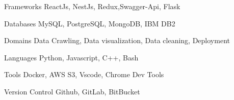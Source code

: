 

\begin{cvskills}

\cvskill
{Frameworks} %
{ReactJs, NestJs, Redux,Swagger-Api, Flask} %

  \cvskill
    {Databases} %
    {MySQL, PostgreSQL, MongoDB, IBM DB2} %


  \cvskill
    {Domains} %
    { Data Crawling, Data visualization, Data cleaning, Deployment} %

  \cvskill
    {Languages} %
    {Python, Javascript, C++, Bash} %

  \cvskill
    {Tools} %
    {Docker, AWS S3, Vscode, Chrome Dev Tools} %

  \cvskill
    {Version Control} %
    {Github, GitLab, BitBucket} %

\end{cvskills}
